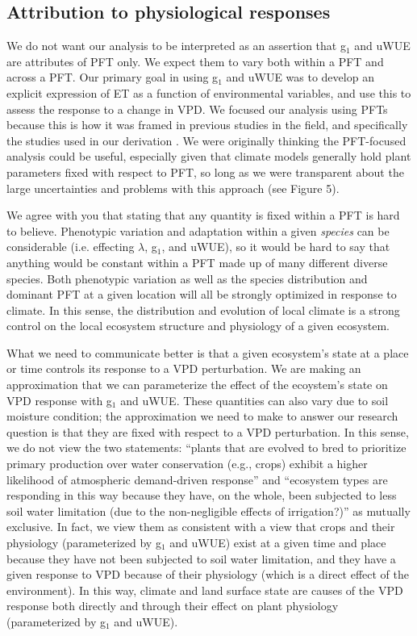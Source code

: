 \subsection{Attribution to physiological responses}

We do not want our analysis to be interpreted as an assertion that
g$_1$ and uWUE are attributes of PFT only. We expect them to vary both
within a PFT and across a PFT. Our primary goal in using g$_1$ and
uWUE was to develop an explicit expression of ET as a function of
environmental variables, and use this to assess the response to a
change in VPD. We focused our analysis using PFTs because this is how
it was framed in previous studies in the field, and specifically the
studies used in our derivation \citep{Zhou_2014, Zhou_2015,
  Medlyn_2017}. We were originally thinking the PFT-focused analysis
could be useful, especially given that climate models generally hold
plant parameters fixed with respect to PFT, so long as we were
transparent about the large uncertainties and problems with this
approach (see Figure 5).

We agree with you that stating that any quantity is fixed within a PFT
is hard to believe. Phenotypic variation and adaptation within a given
\textit{species} can be considerable (i.e. effecting $\lambda$, g$_1$, and
uWUE), so it would be hard to say that anything would be constant
within a PFT made up of many different diverse species. Both
phenotypic variation as well as the species distribution and dominant
PFT at a given location will all be strongly optimized in response to
climate. In this sense, the distribution and evolution of local
climate is a strong control on the local ecosystem structure and
physiology of a given ecosystem.

What we need to communicate better is that a given ecosystem's state
at a place or time controls its response to a VPD perturbation. We are
making an approximation that we can parameterize the effect of the
ecoystem's state on VPD response with g$_1$ and uWUE. These quantities
can also vary due to soil moisture condition; the approximation we
need to make to answer our research question is that they are fixed
with respect to a VPD perturbation. In this sense, we do not view the
two statements: ``plants that are evolved to bred to prioritize
primary production over water conservation (e.g., crops) exhibit a
higher likelihood of atmospheric demand-driven response'' and
``ecosystem types are responding in this way because they have, on the
whole, been subjected to less soil water limitation (due to the
non-negligible effects of irrigation?)'' as mutually exclusive. In
fact, we view them as consistent with a view that crops and their
physiology (parameterized by g$_1$ and uWUE) exist at a given time and
place because they have not been subjected to soil water limitation,
and they have a given response to VPD because of their physiology
(which is a direct effect of the environment). In this way, climate
and land surface state are causes of the VPD response both directly
and through their effect on plant physiology (parameterized by g$_1$
and uWUE).

